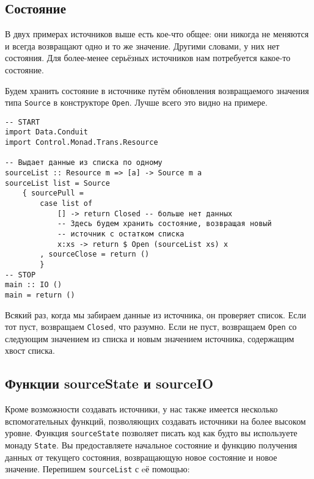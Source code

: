 {\subsection{Состояние}
В двух примерах источников выше есть кое-что общее: они никогда не меняются и всегда возвращают одно и то же
значение. Другими словами, у них нет состояния. Для более-менее серьёзных источников нам
потребуется какое-то состояние.


Будем хранить состояние в источнике путём обновления возвращаемого значения типа
\lstinline=Source= в конструкторе \lstinline=Open=. Лучше всего это видно на
примере.

\begin{lstlisting}
-- START
import Data.Conduit
import Control.Monad.Trans.Resource

-- Выдает данные из списка по одному
sourceList :: Resource m => [a] -> Source m a
sourceList list = Source
    { sourcePull =
        case list of
            [] -> return Closed -- больше нет данных
            -- Здесь будем хранить состояние, возвращая новый 
            -- источник с остатком списка
            x:xs -> return $ Open (sourceList xs) x
        , sourceClose = return ()
        }
-- STOP
main :: IO ()
main = return ()
\end{lstlisting}

Всякий раз, когда мы забираем данные из источника, он проверяет список. Если тот пуст,
возвращаем \lstinline=Closed=, что разумно. Если не пуст, возвращаем \lstinline=Open= со
следующим значением из
списка и новым значением источника, содержащим хвост списка.

\subsection{Функции sourceState и sourceIO}
Кроме возможности создавать источники, у нас также имеется несколько вспомогательных функций,
позволяющих создавать источники на более высоком уровне. Функция \lstinline=sourceState=
позволяет писать
код как будто вы используете монаду \lstinline=State=. Вы предоставляете начальное
состояние и
функцию получения данных от текущего состояния, возвращающую новое состояние и
новое значение. Перепишем \lstinline=sourceList= с eё помощью:

}
